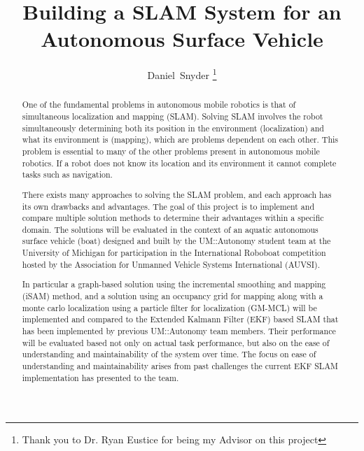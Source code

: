 \documentclass[10pt]{IEEEtran}
\begin{document}
\title{Building a SLAM System for an Autonomous Surface Vehicle}
\author{Daniel~Snyder
\thanks{Thank you to Dr. Ryan Eustice for being my Advisor on this project
}}
\maketitle
\begin{abstract}
One of the fundamental problems in autonomous mobile robotics is that of simultaneous
localization and mapping (SLAM).  Solving SLAM involves the robot simultaneously
determining both its position in the environment (localization) and what its environment
is (mapping), which are problems dependent on each other.  This problem is essential to
many of the other problems present in autonomous mobile robotics.  If a robot does not
know its location and its environment it cannot complete tasks such as navigation.  
 
There exists many approaches to solving the SLAM problem, and each approach has
its own drawbacks and advantages.  The goal of this project is to implement and
compare multiple solution methods to determine their advantages within a specific
domain.  The solutions will be evaluated in the context of an aquatic autonomous surface
vehicle (boat) designed and built by the UM::Autonomy student team at the University
of Michigan for participation in the International Roboboat competition hosted by
the Association for Unmanned Vehicle Systems International (AUVSI).   
  
In particular a graph-based solution using the incremental smoothing and mapping
(iSAM) method, and a solution using an occupancy grid for mapping along with a 
monte carlo localization using a particle filter for localization (GM-MCL) will be implemented and compared
to the Extended Kalmann Filter (EKF) based SLAM that has been implemented by previous
UM::Autonomy team members.  Their performance will be evaluated based not only on
actual task performance, but also on the ease of understanding and maintainability
of the system over time.  The focus on ease of understanding and maintainability
arises from past challenges the current EKF SLAM implementation has presented to the team. 
\end{abstract}
\end{document}
